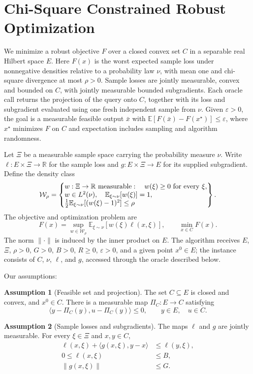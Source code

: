 \documentclass[10pt]{article}
\theoremstyle{definition}
\newtheorem{assumption}{Assumption}
\begin{document}
\section*{Chi-Square Constrained Robust Optimization}
We minimize a robust objective $F$ over a closed convex set $C$ in a separable real Hilbert space $E$. Here $F(x)$ is the worst expected sample loss under nonnegative densities relative to a probability law $\nu$, with mean one and chi-square divergence at most $\rho>0$. Sample losses are jointly measurable, convex and bounded on $C$, with jointly measurable bounded subgradients. Each oracle call returns the projection of the query onto $C$, together with its loss and subgradient evaluated using one fresh independent sample from $\nu$. Given $\varepsilon>0$, the goal is a measurable feasible output $\bar{x}$ with $\mathbb{E}[F(\bar{x})-F(x^\star)]\leq\varepsilon$, where $x^\star$ minimizes $F$ on $C$ and expectation includes sampling and algorithm randomness.

Let $\Xi$ be a measurable sample space carrying the probability measure $\nu$. Write $\ell:E\times\Xi\to\mathbb{R}$ for the sample loss and $g:E\times\Xi\to E$ for its supplied subgradient. Define the density class
\[
\mathcal{W}_{\rho}=\left\{
\begin{array}{@{}l@{}}
w:\Xi\to\mathbb{R}\text{ measurable}:\quad
w(\xi)\geq0\text{ for every }\xi,\\
w\in L^2(\nu),\quad \mathbb{E}_{\xi\sim\nu}[w(\xi)]=1,\\
\frac12\mathbb{E}_{\xi\sim\nu}[(w(\xi)-1)^2]\leq\rho
\end{array}
\right\}.
\]
The objective and optimization problem are
\[
F(x)=\sup_{w\in\mathcal{W}_{\rho}}
\mathbb{E}_{\xi\sim\nu}[w(\xi)\ell(x,\xi)],
\qquad
\min_{x\in C}F(x).
\]
The norm $\|\cdot\|$ is induced by the inner product on $E$. The algorithm receives $E$, $\Xi$, $\rho>0$, $G>0$, $B>0$, $R\geq0$, $\varepsilon>0$, and a given point $x^0\in E$; the instance consists of $C$, $\nu$, $\ell$, and $g$, accessed through the oracle described below.

Our assumptions:
\begin{assumption}[Feasible set and projection]
The set $C\subseteq E$ is closed and convex, and $x^0\in C$. There is a measurable map $\Pi_C:E\to C$ satisfying
\[
\langle y-\Pi_C(y),u-\Pi_C(y)\rangle\leq0,
\qquad y\in E,\quad u\in C.
\]
\end{assumption}

\begin{assumption}[Sample losses and subgradients]
The maps $\ell$ and $g$ are jointly measurable. For every $\xi\in\Xi$ and $x,y\in C$,
\[
\begin{aligned}
\ell(x,\xi)+\langle g(x,\xi),y-x\rangle
&\leq\ell(y,\xi),\\
0\leq\ell(x,\xi)&\leq B,\\
\|g(x,\xi)\|&\leq G.
\end{aligned}
\]
\end{assumption}
\end{document}
